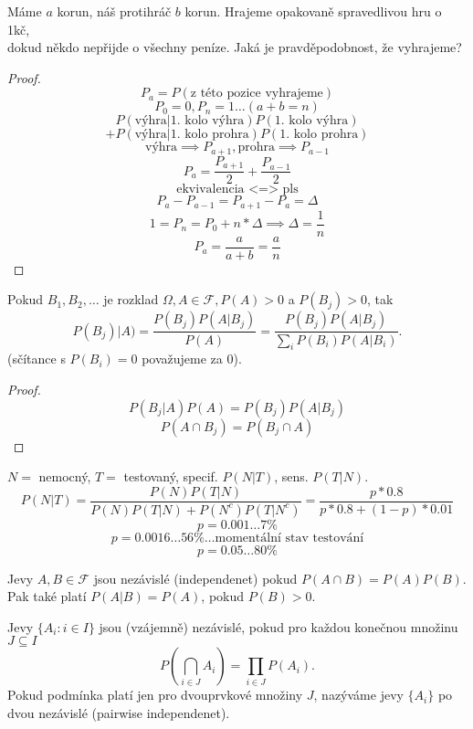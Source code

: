 \documentclass[../main.tex]{subfiles}
\begin{document}
\begin{example}
    Máme $a$ korun, náš protihráč $b$ korun. Hrajeme opakovaně spravedlivou hru o 1kč,\\
    dokud někdo nepřijde o všechny peníze. Jaká je pravděpodobnost, že vyhrajeme?
\end{example}
\begin{proof}
    \[P_a = P(\text{z této pozice vyhrajeme})\]
    \[P_0 = 0, P_n = 1 \dots (a+b = n)\]
    \[P(\text{výhra}|\text{1. kolo výhra})P(\text{1. kolo výhra})\]
    \[+ P(\text{výhra}|\text{1. kolo prohra})P(\text{1. kolo prohra})\]
    \[\text{výhra}\implies P_{a+1}, \text{prohra}\implies P_{a-1}\]
    \[P_a = \frac{P_{a+1}}{2} + \frac{P_{a-1}}{2}\]
    \[\text{ekvivalencia <=> pls}\]
    \[P_a - P_{a-1} = P_{a+1} - P_a = \Delta\]
    \[1 = P_n = P_0 + n*\Delta \implies \Delta = \frac{1}{n}\]
    \[P_a = \frac{a}{a+b} = \frac{a}{n}\]
\end{proof}

\begin{theorem}
    Pokud $B_1,B_2,\dots $ je rozklad $\Omega, A \in \mathcal{F}, P(A) > 0$ a $P(B_j) > 0$, tak
    \[P(B_j)| A) = \frac{P(B_j)P(A|B_j)}{P(A)} = \frac{P(B_j)P(A|B_j)}{\sum_i P(B_i)P(A|B_i)}.\]
    (sčítance s $P(B_i) = 0$ považujeme za $0$).
\end{theorem}
\begin{proof}
    \[P(B_j | A)P(A) = P(B_j)P(A|B_j)\]
    \[P(A\cap B_j) = P(B_j \cap A)\]
\end{proof}


\begin{example}
    $N=$ nemocný, $T=$ testovaný, specif. $P(N|T)$, sens. $P(T|N)$.
    \[P(N|T) = \frac{P(N)P(T|N)}{P(N)P(T|N)+ P(N^c)P(T|N^c)} = \frac{p*0.8}{p*0.8 + (1-p)*0.01}\]
    \[p = 0.001 \dots 7\%\]
    \[p = 0.0016 \dots 56\% \dots \text{momentální stav testování}\]
    \[p = 0.05 \dots 80\%\] 
\end{example}

\begin{definition}
    Jevy $A,B \in \mathcal{F}$ jsou nezávislé (independenet) pokud $P(A\cap B) = P(A)P(B)$.\\
    Pak také platí $P(A|B) = P(A)$, pokud $P(B)>0$.
\end{definition}

\begin{definition}
    Jevy $\{A_i : i \in I\}$ jsou (vzájemně) nezávislé, pokud pro každou konečnou množinu $J \subseteq I$
    \[P(\bigcap_{i\in J} A_i) = \prod_{i\in J} P(A_i).\]
    Pokud podmínka platí jen pro dvouprvkové množiny $J$, nazýváme jevy $\{A_i\}$ po dvou nezávislé (pairwise independenet).
\end{definition}
\end{document}
